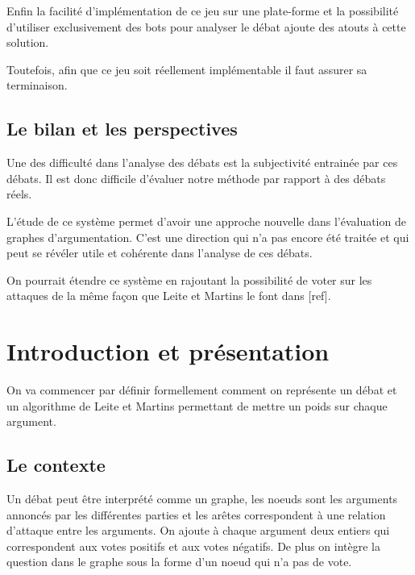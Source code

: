 \documentclass[11pt]{article}
\theoremstyle{defi}
\theoremstyle{not}
\theoremstyle{prob}
\begin{document}
  Enfin la facilité d'implémentation de ce jeu sur une plate-forme et la possibilité d'utiliser exclusivement des bots pour analyser le débat ajoute des atouts à cette solution.

  Toutefois, afin que ce jeu soit réellement implémentable il faut assurer sa terminaison.


\subsection*{Le bilan et les perspectives}
  Une des difficulté dans l'analyse des débats est la subjectivité entrainée par ces débats.
  Il est donc difficile d'évaluer notre méthode par rapport à des débats réels.

  L'étude de ce système permet d'avoir une approche nouvelle dans l'évaluation de graphes d'argumentation.
  C'est une direction qui n'a pas encore été traitée et qui peut se révéler utile et cohérente dans l'analyse de ces débats.

  On pourrait étendre ce système en rajoutant la possibilité de voter sur les attaques de la même façon que Leite et Martins le font dans [ref].


\section{Introduction et présentation}
  On va commencer par définir formellement comment on représente un débat et un algorithme de Leite et Martins permettant de mettre un poids sur chaque argument.

  \subsection{Le contexte}
    Un débat peut être interprété comme un graphe, les noeuds sont les arguments annoncés par les différentes parties et les arêtes correspondent à une relation d'attaque entre les arguments. On ajoute à chaque argument deux entiers qui correspondent aux votes positifs et aux votes négatifs. De plus on intègre la question dans le graphe sous la forme d'un noeud qui n'a pas de vote.
\end{document}
